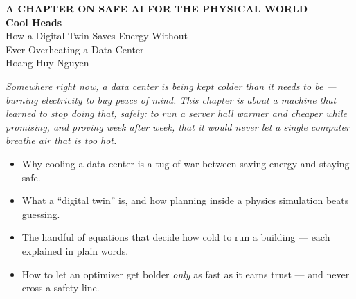 \documentclass[11pt]{report}
\begin{document}
\pagestyle{plain}

\begin{center}
{\small\bfseries\color{kirule}\MakeUppercase{A chapter on safe AI for the physical world}}\\[10pt]
{\huge\bfseries Cool Heads}\\[6pt]
{\Large How a Digital Twin Saves Energy Without\\[2pt] Ever Overheating a Data Center}\\[14pt]
{\large Hoang-Huy Nguyen}\\[6pt]
\end{center}

\vspace{4pt}
\noindent\textit{Somewhere right now, a data center is being kept colder than it needs to be ---
burning electricity to buy peace of mind. This chapter is about a machine that learned to stop
doing that, safely: to run a server hall warmer and cheaper while promising, and proving week
after week, that it would never let a single computer breathe air that is too hot.}

\begin{tcolorbox}[colback=wlbg,colframe=wlrule,boxrule=0.8pt,arc=3pt,
  left=9pt,right=9pt,top=6pt,bottom=6pt,fonttitle=\bfseries,coltitle=white,
  colbacktitle=wlrule,title=What you'll learn]
\begin{itemize}[leftmargin=1.2em,nosep,itemsep=2pt]
  \item Why cooling a data center is a tug-of-war between saving energy and staying safe.
  \item What a ``digital twin'' is, and how planning inside a physics simulation beats guessing.
  \item The handful of equations that decide how cold to run a building --- each explained in plain words.
  \item How to let an optimizer get bolder \emph{only} as fast as it earns trust --- and never cross a safety line.
\end{itemize}
\end{tcolorbox}

\vspace{6pt}
\end{document}
